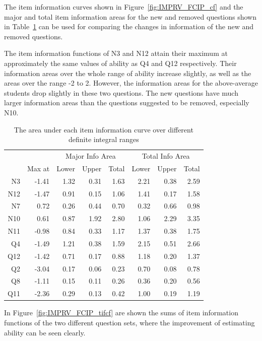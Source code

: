 \documentclass[a4paper]{report}
\begin{document}
The item information curves shown in Figure~\ref{fig:IMPRV_FCIP_cf} and the major and total item information areas for the new and removed questions shown in Table~\ref{tab:IMPRV_FCIP_summaryiif} can be used for comparing the changes in information of the new and removed questions. 

The item information functions of N3 and N12 attain their maximum at approximately the same values of ability as Q4 and Q12 respectively. Their information areas over the whole range of ability increase slightly, as well as the areas over the range -2 to 2. However, the information areas for the above-average students drop slightly in these two questions. The new questions have much larger information areas than the questions suggested to be removed, especially N10. 

\begin{table}[ht]
  \centering
  \begin{tabular}{rr|rrr|rrr}
    \hline
    & & \multicolumn{3}{c|}{Major Info Area} & \multicolumn{3}{c}{Total Info Area} \\
   & Max at & Lower & Upper & Total & Lower & Upper & Total \\ 
   \hline
   N3 & -1.41 & 1.32 & 0.31 & 1.63 & 2.21 & 0.38 & 2.59 \\ 
     N12 & -1.47 & 0.91 & 0.15 & 1.06 & 1.41 & 0.17 & 1.58 \\ 
     N7 & 0.72 & 0.26 & 0.44 & 0.70 & 0.32 & 0.66 & 0.98 \\ 
     N10 & 0.61 & 0.87 & 1.92 & 2.80 & 1.06 & 2.29 & 3.35 \\ 
     N11 & -0.98 & 0.84 & 0.33 & 1.17 & 1.37 & 0.38 & 1.75 \\ 
     \hline
     Q4 & -1.49 & 1.21 & 0.38 & 1.59 & 2.15 & 0.51 & 2.66 \\ 
     Q12 & -1.42 & 0.71 & 0.17 & 0.88 & 1.18 & 0.20 & 1.37 \\ 
     Q2 & -3.04 & 0.17 & 0.06 & 0.23 & 0.70 & 0.08 & 0.78 \\ 
     Q8 & -1.11 & 0.15 & 0.11 & 0.26 & 0.36 & 0.20 & 0.56 \\ 
     Q11 & -2.36 & 0.29 & 0.13 & 0.42 & 1.00 & 0.19 & 1.19 \\ 
      \hline
  \end{tabular}
  \caption{\label{tab:IMPRV_FCIP_summaryiif}The area under each item information curve over different definite integral ranges}
\end{table}

In Figure~\ref{fig:IMPRV_FCIP_tifcf} are shown the sums of item information functions of the two different question sets, where the improvement of estimating ability can be seen clearly. 
\end{document}
